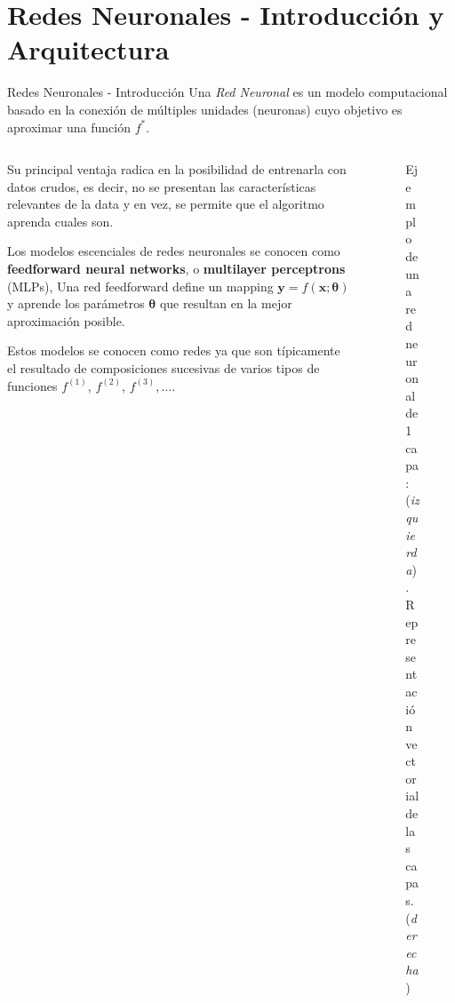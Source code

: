 \documentclass[9pt]{beamer}
\begin{document}
\section{Redes Neuronales - Introducción y Arquitectura}
\begin{frame}{Redes Neuronales - Introducción}
Una \textit{Red Neuronal} es un modelo computacional basado en la conexión de múltiples unidades (neuronas) cuyo objetivo es aproximar una función $f^{*}$.
\pause

\begin{columns}

  \begin{column}{0.5\textwidth}

  Su principal ventaja radica en la posibilidad de entrenarla con datos crudos, es decir, no se presentan las características relevantes de la data y en vez, se permite que el algoritmo aprenda cuales son. \pause

  \vspace{0.1cm}
  Los modelos escenciales de redes neuronales se conocen como \textbf{feedforward neural networks}, o \textbf{multilayer perceptrons} (MLPs), Una red feedforward define un mapping $\bm{y}=f(\bm{x}; \bm{\theta})$ y aprende los parámetros $\bm{\theta}$ que resultan en la mejor aproximación posible. \pause

  \vspace{0.1cm}

  Estos modelos se conocen como redes ya que son típicamente el resultado de composiciones sucesivas de varios tipos de funciones $f^{(1)}$, $f^{(2)}$, $f^{(3)}, \dots$. \pause

  \end{column}
  \begin{column}{0.5\textwidth}
  \begin{figure}[H]
  \centering
  \caption{Ejemplo de una red neuronal de 1 capa: (\textit{izquierda}). \\  Representación vectorial de las capas. (\textit{derecha})}
  \end{figure}

  \end{column}

\end{columns}

\end{frame}
\end{document}
